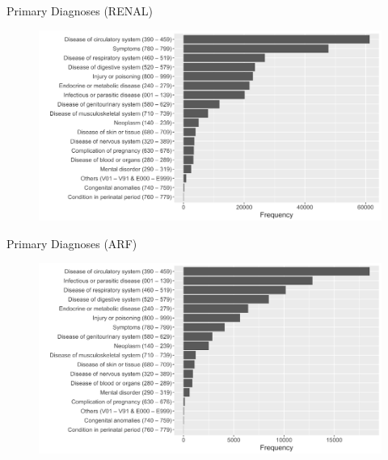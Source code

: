 \documentclass[handout]{beamer} %
\begin{document}
\begin{frame}{Primary Diagnoses (RENAL)}
    \begin{figure}
        \centering
        \includegraphics[width=\textwidth]{img/appendix/Aim3/renal_pri.png}
    \end{figure}
\end{frame}

\begin{frame}{Primary Diagnoses (ARF)}
    \begin{figure}
        \centering
        \includegraphics[width=\textwidth]{img/appendix/Aim3/arf_pri.png}
    \end{figure}
\end{frame}
\end{document}
